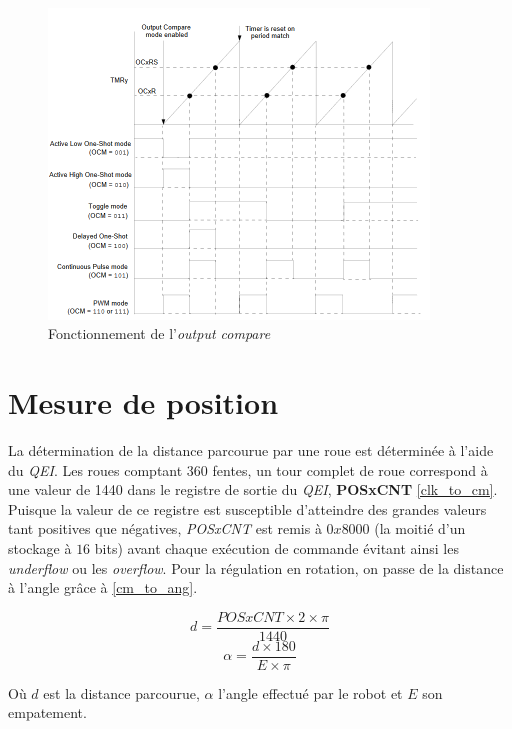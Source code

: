 \begin{figure}[H]
    \centering
    \includegraphics[width=0.9\textwidth]{Pictures/output compare.png}
    \caption{Fonctionnement de l'\textit{output compare}}
    \label{fig:enter-label}
\end{figure}

\section{Mesure de position}

La détermination de la distance parcourue par une roue est déterminée à l'aide du \textit{QEI}. Les roues comptant 360 fentes, un tour complet de roue correspond à une valeur de 1440 dans le registre de sortie du \textit{QEI}, \textbf{POSxCNT} \ref{clk_to_cm}. Puisque la valeur de ce registre est susceptible d'atteindre des grandes valeurs tant positives que négatives, \textit{POSxCNT} est remis à $0x8000$ (la moitié d'un stockage à $16$ bits) avant chaque exécution de commande évitant ainsi les \textit{underflow} ou les \textit{overflow}. Pour la régulation en rotation, on passe de la distance à l'angle grâce à \ref{cm_to_ang}.

\begin{equation}
    d = \frac{POSxCNT \times 2 \times \pi}{1440}
    \label{clk_to_cm}
\end{equation}
\begin{equation}
    \alpha = \frac{d \times 180}{E \times \pi}
    \label{cm_to_ang}
\end{equation}

Où $d$ est la distance parcourue, $\alpha$ l'angle effectué par le robot et $E$ son empatement.

